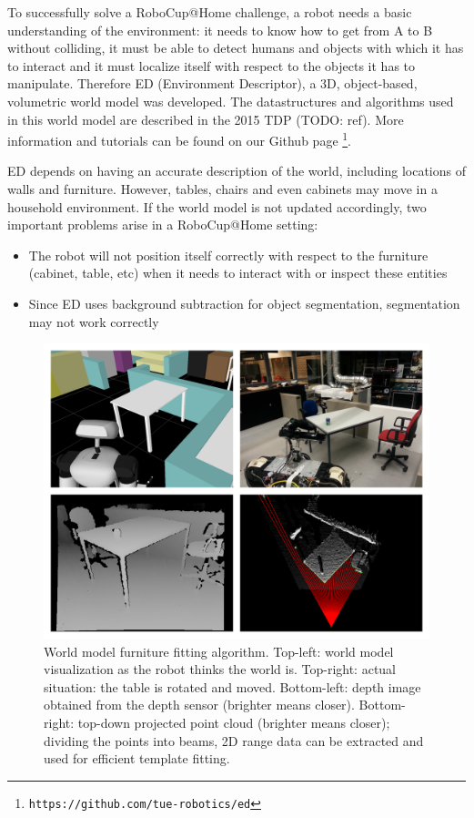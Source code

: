 To successfully solve a RoboCup@Home challenge, a robot needs a basic understanding of the environment: it needs to know how to get from A to B without colliding, it must be able to detect humans and objects with which it has to interact and it must localize itself with respect to the objects it has to manipulate. Therefore ED (Environment Descriptor), a 3D, object-based, volumetric world model was developed. The datastructures and algorithms used in this world model are described in the 2015 TDP (TODO: ref). More information and tutorials can be found on our Github page \footnote{\texttt{https://github.com/tue-robotics/ed}}.

ED depends on having an accurate description of the world, including locations of walls and furniture. However, tables, chairs and even cabinets may move in a household environment. If the world model is not updated accordingly, two important problems arise in a RoboCup@Home setting:

\begin{itemize}
    \item The robot will not position itself correctly with respect to the furniture (cabinet, table, etc) when it needs to interact with or inspect these entities
    \item Since ED uses background subtraction for object segmentation, segmentation may not work correctly
\end{itemize}

\begin{figure}[ht]
        \includegraphics[width = \linewidth]{Figures/fitting}
        \caption{World model furniture fitting algorithm. Top-left: world model visualization as the robot thinks the world is. Top-right: actual situation: the table is rotated and moved. Bottom-left: depth image obtained from the depth sensor (brighter means closer). Bottom-right: top-down projected point cloud (brighter means closer); dividing the points into beams, 2D range data can be extracted and used for efficient template fitting.}
        \label{fig:fitting}
\end{figure}

